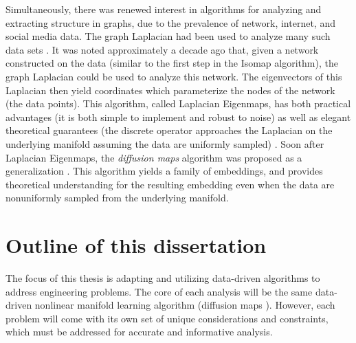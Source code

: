 Simultaneously, there was renewed interest in algorithms for analyzing and extracting structure in graphs, due to the prevalence of network, internet, and social media data. 
%
The graph Laplacian had been used to analyze many such data sets \cite{shi2000normalized, ng2002spectral}. 
%
It was noted approximately a decade ago that, given a network constructed on the data (similar to the first step in the Isomap algorithm), the graph Laplacian could be used to analyze this network. 
%
The eigenvectors of this Laplacian then yield coordinates which parameterize the nodes of the network (the data points). 
%
This algorithm, called Laplacian Eigenmaps, has both practical advantages (it is both simple to implement and robust to noise) as well as elegant theoretical guarantees (the discrete operator approaches the Laplacian on the underlying manifold assuming the data are uniformly sampled) \cite{Belkin2003}. 
%
Soon after Laplacian Eigenmaps, the {\em diffusion maps} algorithm was proposed as a generalization \cite{coifman2005geometric, coifman2006geometric}. 
%
This algorithm yields a family of embeddings, and provides theoretical understanding for the resulting embedding even when the data are nonuniformly sampled from the underlying manifold. 


\section{Outline of this dissertation}

The focus of this thesis is adapting and utilizing data-driven algorithms to address engineering problems. 
%
The core of each analysis will be the same data-driven nonlinear manifold learning algorithm (diffusion maps \citep{Coifman2006}). 
%
However, each problem will come with its own set of unique considerations and constraints, which must be addressed for accurate and informative analysis. 

